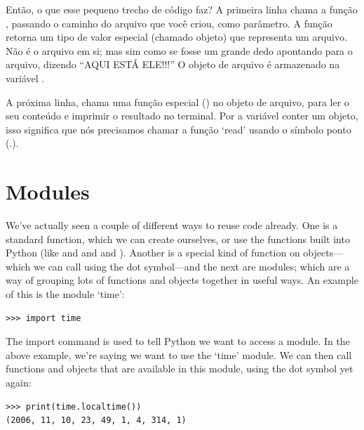 Então, o que esse pequeno trecho de código faz? A primeira linha chama a função , passando o caminho do arquivo que você criou, como parâmetro. A função retorna um tipo de valor especial (chamado objeto) que representa um arquivo. Não é o arquivo em si; mas sim como se fosse um grande dedo apontando para o arquivo, dizendo ``AQUI ESTÁ ELE!!!'' O objeto de arquivo é armazenado na variável .
\par
A próxima linha, chama uma função especial () no objeto de arquivo, para ler o seu conteúdo e imprimir o resultado no terminal. Por a variável  conter um objeto, isso significa que nós precisamos chamar a função `read' usando o símbolo ponto (.).


\section{Modules}

We've actually seen a couple of different ways to reuse code already. One is a standard function, which we can create ourselves, or use the functions built into Python (like  and  and  and ). Another is a special kind of function on objects---which we can call using the dot symbol---and the next are modules; which are a way of grouping lots of functions and objects together in useful ways. An example of this is the module `time':

\begin{listing}
\begin{verbatim}
>>> import time
\end{verbatim}
\end{listing}

The import command is used to tell Python we want to access a module.  In the above example, we're saying we want to use the `time' module. We can then call functions and objects that are available in this module, using the dot symbol yet again:

\begin{listingignore}
\begin{verbatim}
>>> print(time.localtime())
(2006, 11, 10, 23, 49, 1, 4, 314, 1)
\end{verbatim}
\end{listingignore}

